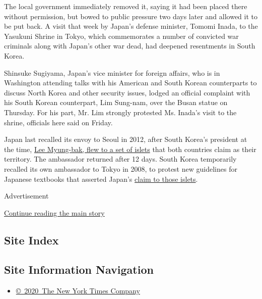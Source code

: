 The local government immediately removed it, saying it had been placed
there without permission, but bowed to public pressure two days later
and allowed it to be put back. A visit that week by Japan's defense
minister, Tomomi Inada, to the Yasukuni Shrine in Tokyo, which
commemorates a number of convicted war criminals along with Japan's
other war dead, had deepened resentments in South Korea.

Shinsuke Sugiyama, Japan's vice minister for foreign affairs, who is in
Washington attending talks with his American and South Korean
counterparts to discuss North Korea and other security issues, lodged an
official complaint with his South Korean counterpart, Lim Sung-nam, over
the Busan statue on Thursday. For his part, Mr. Lim strongly protested
Ms. Inada's visit to the shrine, officials here said on Friday.

Japan last recalled its envoy to Seoul in 2012, after South Korea's
president at the time,
\href{http://www.nytimes3xbfgragh.onion/2012/08/11/world/asia/south-koreans-visit-to-disputed-islets-angers-japan.html}{Lee
Myung-bak, flew to a set of islets} that both countries claim as their
territory. The ambassador returned after 12 days. South Korea
temporarily recalled its own ambassador to Tokyo in 2008, to protest new
guidelines for Japanese textbooks that asserted Japan's
\href{http://www.nytimes3xbfgragh.onion/2008/08/31/world/asia/31islands.html}{claim
to those islets}.

Advertisement

\protect\hyperlink{after-bottom}{Continue reading the main story}

\hypertarget{site-index}{%
\subsection{Site Index}\label{site-index}}

\hypertarget{site-information-navigation}{%
\subsection{Site Information
Navigation}\label{site-information-navigation}}

\begin{itemize}
\tightlist
\item
  \href{https://help.nytimes3xbfgragh.onion/hc/en-us/articles/115014792127-Copyright-notice}{©~2020~The
  New York Times Company}
\end{itemize}

